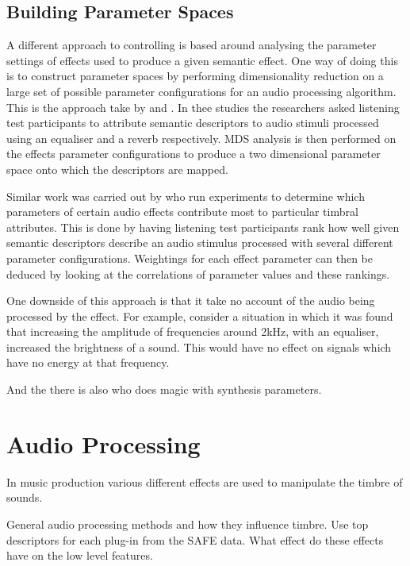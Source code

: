 	\subsection{Building Parameter Spaces}
	\label{sec:Timbre-Control-ParameterSpaces}
		A different approach to controlling is based around analysing the parameter settings of effects used to
		produce a given semantic effect. One way of doing this is to construct parameter spaces by performing
		dimensionality reduction on a large set of possible parameter configurations for an audio processing
		algorithm. This is the approach take by \citet{cartwright2013socialeq} and
		\citet{seetharaman2014crowdsourcing}. In thee studies the researchers asked listening test participants to
		attribute semantic descriptors to audio stimuli processed using an equaliser and a reverb respectively. MDS
		analysis is then performed on the effects parameter configurations to produce a two dimensional parameter
		space onto which the descriptors are mapped.

		Similar work was carried out by \citet{sabin2011weighting} who run experiments to determine which parameters
		of certain audio effects contribute most to particular timbral attributes. This is done by having listening
		test participants rank how well given semantic descriptors describe an audio stimulus processed with several
		different parameter configurations. Weightings for each effect parameter can then be deduced by looking at
		the correlations of parameter values and these rankings.

		One downside of this approach is that it take no account of the audio being processed by the effect. For
		example, consider a situation in which it was found that increasing the amplitude of frequencies around
		2kHz, with an equaliser, increased the brightness of a sound. This would have no effect on signals which
		have no energy at that frequency.

		\note
		{
			And the there is also \citet{huang2014active} who does magic with synthesis parameters.
		}

\section{Audio Processing}
\note
{
	In music production various different effects are used to manipulate the timbre of sounds.

	General audio processing methods and how they influence timbre. Use top descriptors for each plug-in from the SAFE
	data. What effect do these effects have on the low level features.
}

